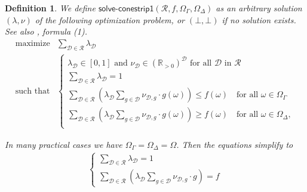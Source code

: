 \documentclass{article}
\theoremstyle{mytheorem}
\newtheorem{definition}[theorem]{Definition}
\newcommand{\func}[1]{\ensuremath{\textsf{#1}}} %
\begin{document}
\begin{definition}
We define $\func{solve-conestrip1}(\mathcal{R}, f, \Omega_\Gamma, \Omega_\Delta)$ as an arbitrary solution $(\lambda, \nu)$ of the following optimization problem, or $(\bot,\bot)$ if no solution exists. See also \cite{Quaeghebeur2014}, formula (1).
\begin{equation} \label{eq:conestrip1}
\begin{array}{ll}
    \text{maximize} & \sum\limits_{\mathcal{D} \in \mathcal{R}} \lambda_\mathcal{D}
    \\ [0.5cm]
    \text{such that} & 
    \left\{
    \begin{array}{ll}
         \lambda_\mathcal{D} \in [0,1] \text{ and } \nu_\mathcal{D} \in (\mathbb{R}_{>0})^\mathcal{D} \text{ for all } \mathcal{D} \text{ in } \mathcal{R} \\ [0.2cm]
    
         \sum\limits_{\mathcal{D} \in \mathcal{R}} \lambda_\mathcal{D} = 1 \\ [0.5cm]
         
         \sum\limits_{\mathcal{D} \in \mathcal{R}}
         (
         \lambda_\mathcal{D} \sum\limits_{g \in \mathcal{D}} \nu_{\mathcal{D},g} \cdot g(\omega)
         )
          \leq f(\omega)
         \quad \text{for all } \omega \in \Omega_\Gamma \\ [0.5cm]         
         \sum\limits_{\mathcal{D} \in \mathcal{R}}
         (
         \lambda_\mathcal{D} \sum\limits_{g \in \mathcal{D}} \nu_{\mathcal{D},g} \cdot g(\omega) 
         )
          \geq f(\omega)
         \quad \text{for all } \omega \in \Omega_\Delta, \\         
    \end{array}
    \right.
\end{array}
\end{equation}

\noindent
In many practical cases we have $\Omega_\Gamma = \Omega_\Delta = \Omega$. Then the equations simplify to
\begin{equation*}
\begin{array}{ll}
    \left\{
    \begin{array}{ll}
         \sum\limits_{\mathcal{D} \in \mathcal{R}} \lambda_\mathcal{D} = 1 \\ [0.5cm]
         
         \sum\limits_{\mathcal{D} \in \mathcal{R}}
         (
         \lambda_\mathcal{D} \sum\limits_{g \in \mathcal{D}} \nu_{\mathcal{D},g} \cdot g
         ) = f
    \end{array}
    \right.
\end{array}
\end{equation*}
\end{definition}
\end{document}

